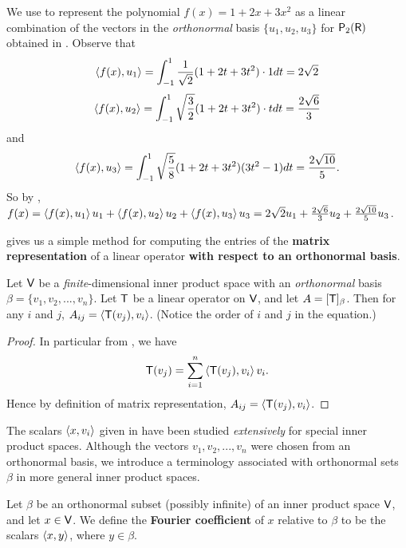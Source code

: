 \begin{example} \label{example 6.2.6}
We use  to represent the polynomial \(f(x) = 1 + 2x + 3x^2\) as a linear combination of the vectors in the \emph{orthonormal} basis \(\{ u_1, u_2, u_3 \}\) for \(\textsf{P}_2(\textsf{R})\) obtained in .
Observe that
\[
    \left< f(x), u_1 \right> = \int_{-1}^{1} \frac{1}{\sqrt{2}} (1+2 t+3 t^2) \cdot 1 dt = 2 \sqrt{2}
\]
\[
    \left< f(x), u_2 \right> = \int_{-1}^{1} \sqrt{\frac{3}{2}} (1+2 t+3 t^2) \cdot t dt = \frac{2 \sqrt{6}}{3}
\]
and
\[
    \left< f(x), u_3 \right> = \int_{-1}^{1} \sqrt{\frac{5}{8}} (1 + 2t + 3t^2) (3 t^2 - 1) d t = \frac{2 \sqrt{10}}{5}.
\]
So by , \(f(x) = \left< f(x), u_1 \right> u_1 + \left< f(x), u_2 \right> u_2 + \left< f(x), u_3 \right> u_3 = 2 \sqrt{2} u_1 + \frac{2 \sqrt{6}}{3} u_2 + \frac{2 \sqrt{10}}{5} u_3\).
\end{example}

 gives us a simple method for computing the entries of the \textbf{matrix representation} of a linear operator \textbf{with respect to an orthonormal basis}.

\begin{corollary} \label{corollary 6.5.1}
Let \(\textsf{V}\) be a \emph{finite}-dimensional inner product space with an \emph{orthonormal} basis \(\beta = \{ v_1, v_2, ..., v_n \}\).
Let \(\textsf{T}\) be a linear operator on \(\textsf{V}\), and let \(A = [\textsf{T}]_{\beta}\).
Then for any \(i\) and \(j\), \(A_{ij} = \left< \textsf{T}(v_j), v_i \right>\).
(Notice the order of \(i\) and \(j\) in the equation.)
\end{corollary}

\begin{proof}
In particular from , we have
\[
    \textsf{T}(v_j) = \sum_{i = 1}^n \left< \textsf{T}(v_j), v_i \right> v_i.
\]
Hence by definition of matrix representation, \(A_{ij} = \left< \textsf{T}(v_j), v_i \right>\).
\end{proof}

\begin{remark} \label{remark 6.2.5}
The scalars \(\left< x, v_i \right>\) given in  have been studied \emph{extensively} for special inner product spaces. 
Although the vectors \(v_1, v_2, ..., v_n\) were chosen from an orthonormal basis, we introduce a terminology associated
with orthonormal sets \(\beta\) in more general inner product spaces.
\end{remark}

\begin{definition} \label{def 6.6}
Let \(\beta\) be an orthonormal subset (possibly infinite) of an inner product space \(\textsf{V}\), and let \(x \in \textsf{V}\).
We define the \textbf{Fourier coefficient} of \(x\) relative to \(\beta\) to be the scalars \(\left< x, y \right>\), where \(y \in \beta\).
\end{definition}

